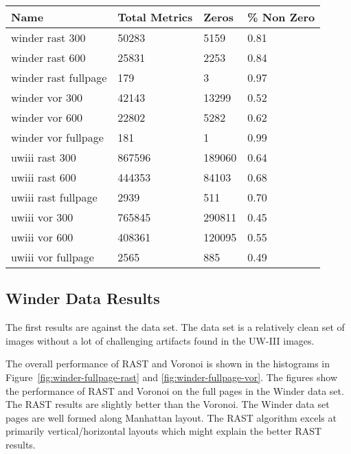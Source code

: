 \documentclass[conference]{IEEEtran}
\begin{document}
    \begin{tabular}{| l | l | l | l | }
    \hline
    Name    &   Total Metrics & Zeros & \% Non Zero \\
    \hline 
    winder rast 300 & 50283 & 5159 & 0.81 \\
    \hline

    winder rast 600 & 25831 & 2253 & 0.84 \\
    \hline

    winder rast fullpage & 179 & 3 & 0.97 \\
    \hline

    winder vor 300 & 42143 & 13299 & 0.52 \\
    \hline

    winder vor 600 & 22802 & 5282 & 0.62 \\
    \hline

    winder vor fullpage & 181 & 1 & 0.99 \\
    \hline

    uwiii rast 300 & 867596 & 189060 & 0.64 \\
    \hline

    uwiii rast 600 & 444353 & 84103 & 0.68 \\
    \hline

    uwiii rast fullpage & 2939 & 511 & 0.70 \\
    \hline

    uwiii vor 300 & 765845 & 290811 & 0.45 \\
    \hline

    uwiii vor 600 & 408361 & 120095 & 0.55 \\
    \hline

    uwiii vor fullpage & 2565 & 885 & 0.49 \\
    \hline

    \end{tabular}

%
%
\subsection{Winder Data Results}

The first results are against the \cite{IEEEhowto:Winder} data set. The
\cite{IEEEhowto:Winder} data set is a relatively clean set of images without a
lot of challenging artifacts found in the UW-III images.

The overall performance of RAST and Voronoi is shown in the histograms in
Figure~\ref{fig:winder-fullpage-rast} and \ref{fig:winder-fullpage-vor}. The figures
show the performance of RAST and Voronoi on the full pages in the Winder
data set. The RAST results are slightly better than the Voronoi. The Winder
data set pages are well formed along Manhattan layout. The RAST algorithm
excels at primarily vertical/horizontal layouts which might explain the better
RAST results.
\end{document}
